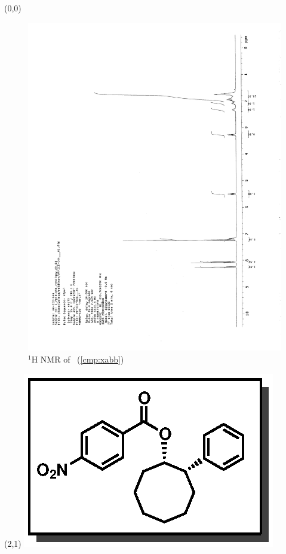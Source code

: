 \begin{textblock}{20}(0,0)
\begin{figure}[htb]
\caption{$^1$H NMR of \CMPxabb\ (\ref{cmp:xabb})}
\includegraphics[scale=0.75, trim = 0mm 0mm 0mm 5mm,
clip]{chp_asymmetric/images/nmr/xabbH}
\vspace{-100pt}
\end{figure}
\end{textblock}
\begin{textblock}{1}(2,1)
\includegraphics[scale=0.8, angle=90]{chp_asymmetric/images/xabb}
\end{textblock}
